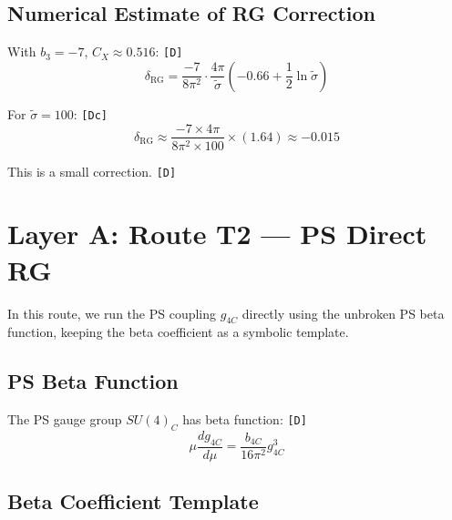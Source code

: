 \documentclass[11pt,a4paper]{article}
\newcommand{\tagD}{\textcolor{green!50!black}{\texttt{[D]}}}
\newcommand{\tagDc}{\textcolor{blue!70!black}{\texttt{[Dc]}}}
\theoremstyle{definition}
\begin{document}
\subsection{Numerical Estimate of RG Correction}
\label{subsec:rg-numerical}

With $b_3 = -7$, $C_X \approx 0.516$: \tagD{}
\begin{equation}
\label{eq:delta-rg-estimate}
\delta_{\text{RG}} = \frac{-7}{8\pi^2} \cdot \frac{4\pi}{\tilde{\sigma}} \left(-0.66 + \frac{1}{2}\ln\tilde{\sigma}\right)
\end{equation}

For $\tilde{\sigma} = 100$: \tagDc{}
\begin{equation}
\label{eq:delta-rg-example}
\delta_{\text{RG}} \approx \frac{-7 \times 4\pi}{8\pi^2 \times 100} \times (1.64) \approx -0.015
\end{equation}

This is a small correction. \tagD{}

\section{Layer A: Route T2 --- PS Direct RG}
\label{sec:route-t2}

\begin{routebox}
In this route, we run the PS coupling $g_{4C}$ directly using the unbroken
PS beta function, keeping the beta coefficient as a symbolic template.
\end{routebox}

\subsection{PS Beta Function}
\label{subsec:ps-beta}

The PS gauge group $SU(4)_C$ has beta function: \tagD{}
\begin{equation}
\label{eq:ps-beta}
\mu \frac{dg_{4C}}{d\mu} = \frac{b_{4C}}{16\pi^2} g_{4C}^3
\end{equation}

\subsection{Beta Coefficient Template}
\label{subsec:beta-template}
\end{document}
